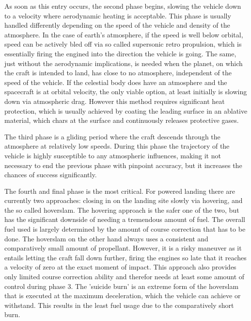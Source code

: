 As soon as this entry occurs, the second phase begins, slowing the vehicle down to a velocity where aerodynamic heating is acceptable. This phase is usually handled differently depending on the speed of the vehicle and density of the atmosphere. In the case of earth's atmosphere, if the speed is well below orbital, speed can be actively bled off via so called supersonic retro propulsion, which is essentially firing the engined into the direction the vehicle is going. The same, just without the aerodynamic implications, is needed when the planet, on which the craft is intended to land, has close to no atmosphere, independent of the speed of the vehicle. If the celestial body does have an atmosphere and the spacecraft is at orbital velocity, the only viable option, at least initially is slowing down via atmospheric drag. However this method requires significant heat protection, which is usually achieved by coating the leading surface in an ablative material, which chars at the surface and continuously releases protective gases.

The third phase is a gliding period where the craft descends through the atmosphere at relatively low speeds. During this phase the trajectory of the vehicle is highly susceptible to any atmospheric influences, making it not necessary to end the previous phase with pinpoint accuracy, but it increases the chances of success significantly.

The fourth and final phase is the most critical. For powered landing there are currently two approaches: closing in on the landing site slowly via hovering, and the so called hoverslam. The hovering approach is the safer one of the two, but has the significant downside of needing a tremendous amount of fuel. The overall fuel used is largely determined by the amount of course correction that has to be done. The hoverslam on the other hand always uses a consistent and comparatively small amount of propellant. However, it is a risky maneuver as it entails letting the craft fall down further, firing the engines so late that it reaches a velocity of zero at the exact moment of impact. This approach also provides only limited course correction ability and therefor needs at least some amount of control during phase 3. The 'suicide burn' is an extreme form of the hoverslam that is executed at the maximum deceleration, which the vehicle can achieve or withstand. This results in the least fuel usage due to the comparatively short burn.



